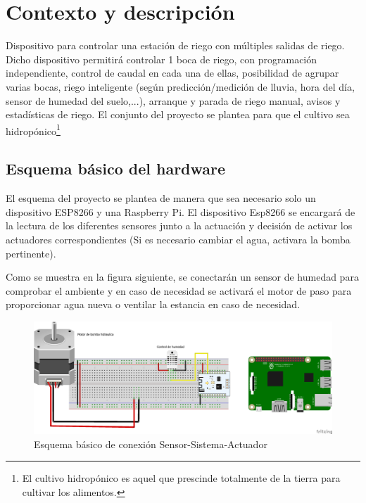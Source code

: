 \documentclass[12pt,a4paper,titlepage,oneside]{report}
\title{\titulo}
\author{\autor}
\begin{document}



\tableofcontents
\listoffigures

\chapter{Contexto y descripción}

	Dispositivo para controlar una estación de riego 
con múltiples salidas de riego. Dicho dispositivo 
permitirá controlar 1 boca de riego, con programación 
independiente, control de caudal en cada una de ellas, posibilidad 
de agrupar varias bocas, riego inteligente (según predicción/medición 
de lluvia, hora del día, sensor de humedad del suelo,...), arranque y
 parada de riego manual, avisos y estadísticas de riego. El conjunto del proyecto se plantea para que el cultivo sea hidropónico\footnote{El cultivo hidropónico es aquel que prescinde totalmente de la tierra para cultivar los alimentos.}

\section{Esquema básico del hardware}

	El esquema del proyecto se plantea de manera que sea necesario solo un dispositivo ESP8266 y una Raspberry Pi. El dispositivo Esp8266 se encargará de la lectura de los diferentes sensores junto a la actuación y decisión de activar los actuadores	correspondientes (Si es necesario cambiar el agua, activara la bomba pertinente).
	
	Como se muestra en la figura siguiente, se conectarán un sensor de humedad para comprobar el ambiente y en caso de necesidad se activará el motor de paso para proporcionar agua nueva o ventilar la estancia en caso de necesidad.
	
	\begin{figure}
		\center
		\includegraphics[scale=0.5]{./images/Conexion.png}
		\caption{Esquema básico de conexión Sensor-Sistema-Actuador}
		\label{Esquema_basico}
	\end{figure}		
	
\end{document}
